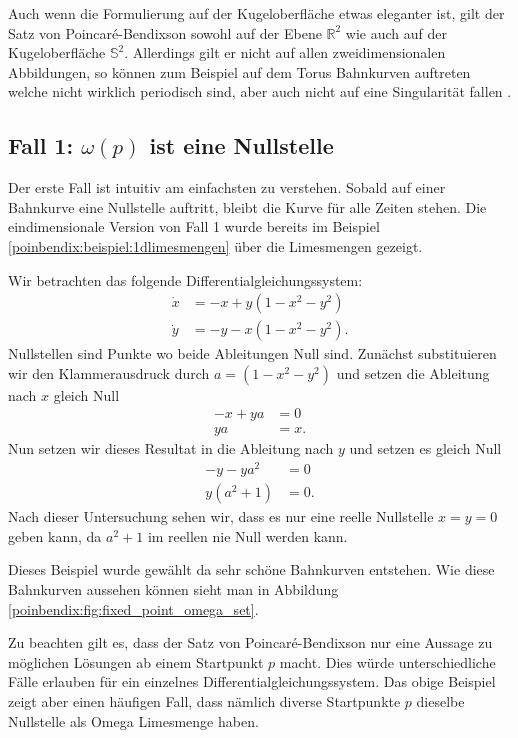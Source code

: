 Auch wenn die Formulierung auf der Kugeloberfläche etwas eleganter ist, gilt der Satz von Poincaré-Bendixson sowohl auf der Ebene $\mathbb{R}^2$ wie auch auf der Kugeloberfläche $\mathbb{S}^2$.
Allerdings gilt er nicht auf allen zweidimensionalen Abbildungen, so können zum Beispiel auf dem Torus Bahnkurven auftreten welche nicht wirklich periodisch sind, aber auch nicht auf eine Singularität fallen \cite{poinbendix:wiki}.


\subsection{Fall 1: $\omega(p)$ ist eine Nullstelle} \label{poinbendix:subsection:fall1}

Der erste Fall ist intuitiv am einfachsten zu verstehen.
Sobald auf einer Bahnkurve eine Nullstelle auftritt, bleibt die Kurve für alle Zeiten stehen.
Die eindimensionale Version von Fall 1  wurde bereits im Beispiel \ref{poinbendix:beispiel:1dlimesmengen} über die Limesmengen gezeigt.

\begin{beispiel} \label{poinbendix:beispiel:fall1}
Wir betrachten das folgende Differentialgleichungssystem:
\begin{align*}
    \dot{x} &= -x + y(1-x^2-y^2) \\
    \dot{y} &= -y - x(1-x^2-y^2).
\end{align*}
Nullstellen sind Punkte wo beide Ableitungen Null sind.
Zunächst substituieren wir den Klammerausdruck durch $a = (1-x^2-y^2)$ und setzen die Ableitung nach $x$ gleich Null
\begin{align*}
    -x + ya &= 0 \\
    ya &= x.
\end{align*}
Nun setzen wir dieses Resultat in die Ableitung nach $y$ und setzen es gleich Null
\begin{align*}
    -y - ya^2 &= 0 \\
    y(a^2+1) &= 0.
\end{align*}
Nach dieser Untersuchung sehen wir, dass es nur eine reelle Nullstelle $x=y=0$ geben kann, da $a^2 + 1$ im reellen nie Null werden kann.

Dieses Beispiel wurde gewählt da sehr schöne Bahnkurven entstehen.
Wie diese Bahnkurven aussehen können sieht man in Abbildung \ref{poinbendix:fig:fixed_point_omega_set}.
\end{beispiel}

Zu beachten gilt es, dass der Satz von Poincaré-Bendixson nur eine Aussage zu möglichen Lösungen ab einem Startpunkt $p$ macht.
Dies würde unterschiedliche Fälle erlauben für ein einzelnes Differentialgleichungssystem.
Das obige Beispiel zeigt aber einen häufigen Fall, dass nämlich diverse Startpunkte $p$ dieselbe Nullstelle als Omega Limesmenge haben.

